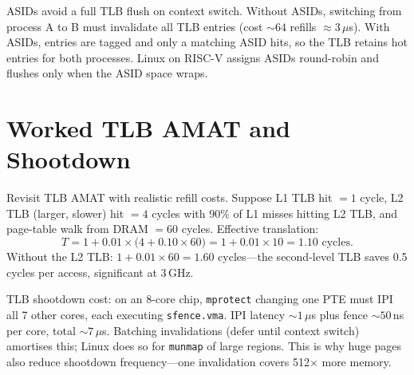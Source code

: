 ASIDs avoid a full TLB flush on context switch. Without ASIDs, switching from process A to B must invalidate all TLB entries (cost $\sim 64$ refills $\approx 3$\,$\mu$s). With ASIDs, entries are tagged and only a matching ASID hits, so the TLB retains hot entries for both processes. Linux on RISC-V assigns ASIDs round-robin and flushes only when the ASID space wraps.
\begin{center}
\end{center}

\section{Worked TLB AMAT and Shootdown}
Revisit TLB AMAT with realistic refill costs. Suppose L1 TLB hit $=1$ cycle, L2 TLB (larger, slower) hit $=4$ cycles with 90\% of L1 misses hitting L2 TLB, and page-table walk from DRAM $=60$ cycles. Effective translation:
\[ T = 1 + 0.01\times\big(4 + 0.10\times60\big)=1+0.01\times10=1.10\text{ cycles}. \]
Without the L2 TLB: $1+0.01\times60=1.60$ cycles---the second-level TLB saves 0.5 cycles per access, significant at 3\,GHz.

TLB shootdown cost: on an 8-core chip, \texttt{mprotect} changing one PTE must IPI all 7 other cores, each executing \texttt{sfence.vma}. IPI latency $\sim 1$\,$\mu$s plus fence $\sim 50$\,ns per core, total $\sim 7$\,$\mu$s. Batching invalidations (defer until context switch) amortises this; Linux does so for \texttt{munmap} of large regions. This is why huge pages also reduce shootdown frequency---one invalidation covers 512$\times$ more memory.

